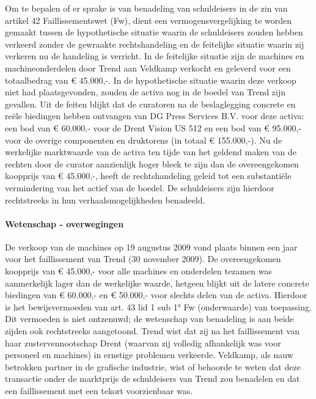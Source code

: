 \documentclass[
  dutch,
  a4paper,
]{article}
\begin{document}
Om te bepalen of er sprake is van benadeling van schuldeisers in de zin van artikel 42 Faillissementswet (Fw), dient een vermogensvergelijking te worden gemaakt tussen de hypothetische situatie waarin de schuldeisers zouden hebben verkeerd zonder de gewraakte rechtshandeling en de feitelijke situatie waarin zij verkeren nu de handeling is verricht. In de feitelijke situatie zijn de machines en machineonderdelen door Trend aan Veldkamp verkocht en geleverd voor een totaalbedrag van € 45.000,-. In de hypothetische situatie waarin deze verkoop niet had plaatsgevonden, zouden de activa nog in de boedel van Trend zijn gevallen. Uit de feiten blijkt dat de curatoren na de beslaglegging concrete en reële biedingen hebben ontvangen van DG Press Services B.V. voor deze activa: een bod van € 60.000,- voor de Drent Vision US 512 en een bod van € 95.000,- voor de overige componenten en druktorens (in totaal € 155.000,-). Nu de werkelijke marktwaarde van de activa ten tijde van het geldend maken van de rechten door de curator aanzienlijk hoger bleek te zijn dan de overeengekomen koopprijs van € 45.000,-, heeft de rechtshandeling geleid tot een substantiële vermindering van het actief van de boedel. De schuldeisers zijn hierdoor rechtstreeks in hun verhaalsmogelijkheden benadeeld.

\paragraph{Wetenschap - overwegingen}\label{wetenschap---overwegingen-68}

De verkoop van de machines op 19 augustus 2009 vond plaats binnen een jaar voor het faillissement van Trend (30 november 2009). De overeengekomen koopprijs van € 45.000,- voor alle machines en onderdelen tezamen was aanmerkelijk lager dan de werkelijke waarde, hetgeen blijkt uit de latere concrete biedingen van € 60.000,- en € 50.000,- voor slechts delen van de activa. Hierdoor is het bewijsvermoeden van art. 43 lid 1 sub 1° Fw (onderwaarde) van toepassing. Dit vermoeden is niet ontzenuwd; de wetenschap van benadeling is aan beide zijden ook rechtstreeks aangetoond. Trend wist dat zij na het faillissement van haar zustervennootschap Drent (waarvan zij volledig afhankelijk was voor personeel en machines) in ernstige problemen verkeerde. Veldkamp, als nauw betrokken partner in de grafische industrie, wist of behoorde te weten dat deze transactie onder de marktprijs de schuldeisers van Trend zou benadelen en dat een faillissement met een tekort voorzienbaar was.
\end{document}

